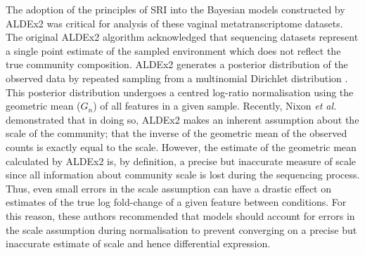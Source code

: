 \documentclass[sn-mathphys,Numbered]{sn-jnl}%
\begin{document}
The adoption of the principles of SRI into the Bayesian models constructed by ALDEx2 was critical for analysis of these vaginal metatranscriptome datasets. The original ALDEx2 algorithm acknowledged that sequencing datasets represent a single point estimate of the sampled environment which does not reflect the true community composition. ALDEx2 generates a posterior distribution of the observed data by repeated sampling from a multinomial Dirichlet distribution \citep{fernandes:2013}. This posterior distribution undergoes a centred log-ratio normalisation using the geometric mean ($G_n$) of all features in a given sample. Recently, Nixon \textit{et al.} \citep{nixon2023scale} demonstrated that in doing so, ALDEx2 makes an inherent assumption about the scale of the community; that the inverse of the geometric mean of the observed counts is exactly equal to the scale. However, the estimate of the geometric mean calculated by ALDEx2 is, by definition, a precise but inaccurate measure of scale since all information about community scale is lost during the sequencing process. Thus, even small errors in the scale assumption can have a drastic effect on estimates of the true log fold-change of a given feature between conditions. For this reason, these authors recommended that models should account for errors in the scale assumption during normalisation to prevent converging on a precise but inaccurate estimate of scale and hence differential expression. 

\end{document}

